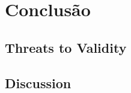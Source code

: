 \section{Conclus\~{a}o}\label{sec:conclusao}

\subsection{Threats to Validity}

\subsection{Discussion}